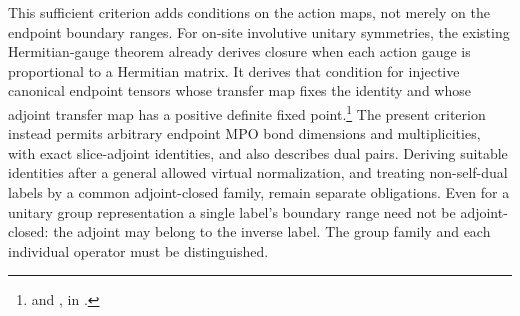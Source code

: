 \documentclass{article}
\begin{document}
This sufficient criterion adds conditions on the action maps, not
merely on the endpoint boundary ranges. For on-site involutive unitary
symmetries, the existing Hermitian-gauge theorem already derives closure
when each action gauge is proportional to a Hermitian matrix. It derives
that condition for injective canonical endpoint tensors whose transfer
map fixes the identity and whose adjoint transfer map has a positive
definite fixed point.\footnote{
    and
    ,
    in .}
The present criterion instead permits arbitrary endpoint MPO bond
dimensions and multiplicities, with exact slice-adjoint identities,
and also describes dual pairs. Deriving suitable identities after a
general allowed virtual normalization, and treating non-self-dual labels
by a common adjoint-closed family, remain separate obligations.
Even for a unitary group representation a single label's
boundary range need not be adjoint-closed: the adjoint may belong to the
inverse label. The group family and each individual operator must be
distinguished.



\end{document}
